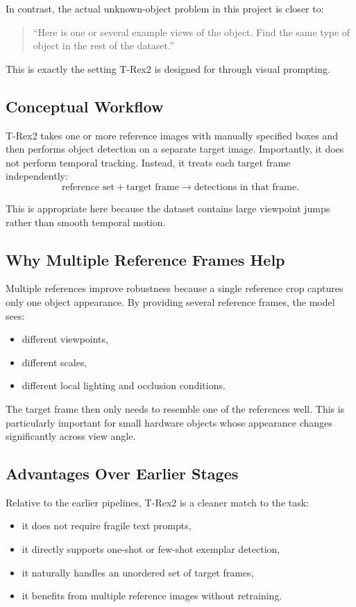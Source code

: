 \documentclass[11pt,a4paper]{article}
\begin{document}
In contrast, the actual unknown-object problem in this project is closer to:
\begin{quote}
``Here is one or several example views of the object. Find the same type of object in the rest of the dataset.''
\end{quote}

This is exactly the setting T-Rex2 is designed for through visual prompting.

\subsection{Conceptual Workflow}

T-Rex2 takes one or more reference images with manually specified boxes and then performs object detection on a separate target image. Importantly, it does not perform temporal tracking. Instead, it treats each target frame independently:
\[
\text{reference set} + \text{target frame} \rightarrow \text{detections in that frame}.
\]

This is appropriate here because the dataset contains large viewpoint jumps rather than smooth temporal motion.

\subsection{Why Multiple Reference Frames Help}

Multiple references improve robustness because a single reference crop captures only one object appearance. By providing several reference frames, the model sees:
\begin{itemize}[leftmargin=1.5em]
  \item different viewpoints,
  \item different scales,
  \item different local lighting and occlusion conditions.
\end{itemize}

The target frame then only needs to resemble one of the references well. This is particularly important for small hardware objects whose appearance changes significantly across view angle.

\subsection{Advantages Over Earlier Stages}

Relative to the earlier pipelines, T-Rex2 is a cleaner match to the task:
\begin{itemize}[leftmargin=1.5em]
  \item it does not require fragile text prompts,
  \item it directly supports one-shot or few-shot exemplar detection,
  \item it naturally handles an unordered set of target frames,
  \item it benefits from multiple reference images without retraining.
\end{itemize}
\end{document}
